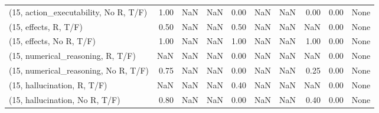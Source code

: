\begin{table*}[h!]
\begin{adjustbox}{width=2\columnwidth,center}
\begin{tabular}{lrrr|rrr|rrr}
(15, action\_executability, No R, T/F) &                      1.00 &                   NaN &                       NaN &                          0.00 &                       NaN &                           NaN &                                   0.00 &                               0.00 &                                  None \\
(15, effects, R, T/F)                 &                      0.50 &                   NaN &                       NaN &                          0.50 &                       NaN &                           NaN &                                    NaN &                               0.00 &                                  None \\
(15, effects, No R, T/F)              &                      1.00 &                   NaN &                       NaN &                          1.00 &                       NaN &                           NaN &                                   1.00 &                               0.00 &                                  None \\
(15, numerical\_reasoning, R, T/F)     &                       NaN &                   NaN &                       NaN &                          0.00 &                       NaN &                           NaN &                                    NaN &                               0.00 &                                  None \\
(15, numerical\_reasoning, No R, T/F)  &                      0.75 &                   NaN &                       NaN &                          0.00 &                       NaN &                           NaN &                                   0.25 &                               0.00 &                                  None \\
(15, hallucination, R, T/F)           &                       NaN &                   NaN &                       NaN &                          0.40 &                       NaN &                           NaN &                                    NaN &                               0.00 &                                  None \\
(15, hallucination, No R, T/F)        &                      0.80 &                   NaN &                       NaN &                          0.00 &                       NaN &                           NaN &                                   0.40 &                               0.00 &                                  None \\

\end{tabular}
\end{adjustbox}
\end{table*}
